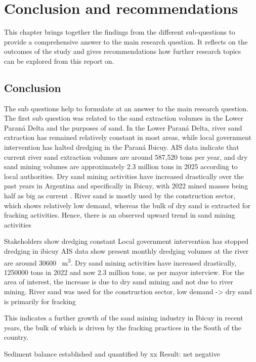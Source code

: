 \chapter{Conclusion and recommendations}
\label{chapter:conclusion}
This chapter brings together the findings from the different sub-questions to provide a comprehensive answer to the main research question. It reflects on the outcomes of the study and gives recommendations how further research topics can be explored from this report on.

\section{Conclusion}
The sub questions help to formulate at an answer to the main research question. The first sub question was related to the sand extraction volumes in the Lower Paraná Delta and the purposes of sand. In the Lower Paraná Delta, river sand extraction has remained relatively constant in most areas, while local government intervention has halted dredging in the Paraná Ibicuy. AIS data indicate that current river sand extraction volumes are around 587,520 tons per year, and dry sand mining volumes are approximately 2.3 million tons in 2025 according to local authorities. Dry sand mining activities have increased drastically over the past years in Argentina and specifically in Ibicuy, with 2022 mined masses being half as big as current . River sand is mostly used by the construction sector, which shows relatively low demand, whereas the bulk of dry sand is extracted for fracking activities. Hence, there is an observed upward trend in sand mining activities 


Stakeholders show dredging constant
Local government intervention has stopped dredging in ibicuy
AIS data show present monthly dredging volumes at the river are around 30600 ~m\textsuperscript{3}. 
Dry sand mining activities have increased drastically, 1250000 tons in 2022 and now 2.3 million tons, as per mayor interview.
For the area of interest, the increase is due to dry sand mining and not due to river mining.
River sand was used for the construction sector, low demand -> dry sand is primarily for fracking




This indicates a further growth of the sand mining industry in Ibicuy in recent years, the bulk of which is driven by the fracking practices in the South of the country.

Sediment balance established and quantified by xx
Result: net negative

